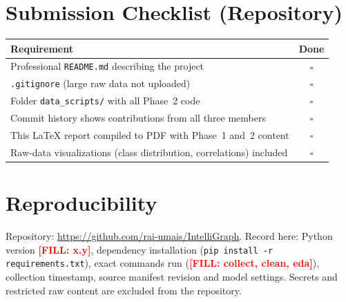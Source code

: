 \documentclass[11pt,a4paper]{article}
\newcommand{\todo}[1]{\textcolor{red}{\textbf{[FILL: #1]}}}
\begin{document}
\section*{Submission Checklist (Repository)}
\begin{table}[H]
\centering
\begin{tabular}{p{9cm}c}
\toprule
\textbf{Requirement} & \textbf{Done} \\
\midrule
Professional \texttt{README.md} describing the project & $\square$ \\
\texttt{.gitignore} (large raw data not uploaded) & $\square$ \\
Folder \texttt{data\_scripts/} with all Phase~2 code & $\square$ \\
Commit history shows contributions from all three members & $\square$ \\
This LaTeX report compiled to PDF with Phase~1 and~2 content & $\square$ \\
Raw-data visualizations (class distribution, correlations) included & $\square$ \\
\bottomrule
\end{tabular}
\end{table}

\section*{Reproducibility}
Repository: \url{https://github.com/rai-umais/IntelliGraph}. Record here: Python version \todo{x.y}, dependency installation (\texttt{pip install -r requirements.txt}), exact commands run (\todo{collect, clean, eda}), collection timestamp, source manifest revision and model settings. Secrets and restricted raw content are excluded from the repository.
\end{document}
